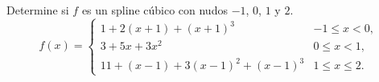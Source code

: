 \begin{statement}{1}
  Determine si $f$ es un spline c\'ubico con nudos $-1$, $0$, $1$ y $2$.
  \[
    f(x) = 
    \begin{cases}
      1 + 2(x + 1) + (x + 1)^3 & -1 \leq x < 0, \\
      3 + 5x + 3x^2 & 0 \leq x < 1, \\
      11 + (x - 1) + 3 (x - 1)^2 + (x - 1)^3 & 1 \leq x \leq 2.
    \end{cases}
  \]
\end{statement}

